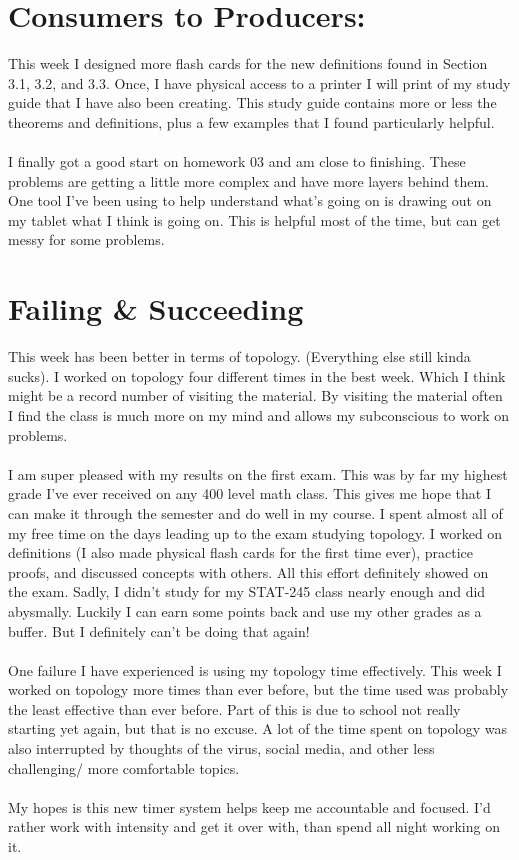 \documentclass[10pt]{article}
\begin{document}
\section*{Consumers to Producers:}
This week I designed more flash cards for the new definitions found in Section 3.1, 3.2, and 3.3. Once, I have physical access to a printer I will print of my study guide that I have also been creating. This study guide contains more or less the theorems and definitions, plus a few examples that I found particularly helpful.\\
\\
I finally got a good start on homework 03 and am close to finishing. These problems are getting a little more complex and have more layers behind them. One tool I've been using to help understand what's going on is drawing out on my tablet what I think is going on. This is helpful most of the time, but can get messy for some problems.

\section*{Failing \& Succeeding}
This week has been better in terms of topology. (Everything else still kinda sucks). I worked on topology four different times in the best week. Which I think might be a record number of visiting the material. By visiting the material often I find the class is much more on my mind and allows my subconscious to work on problems.\\
\\
I am super pleased with my results on the first exam. This was by far my highest grade I've ever received on any 400 level math class. This gives me hope that I can make it through the semester and do well in my course. I spent almost all of my free time on the days leading up to the exam studying topology. I worked on definitions (I also made physical flash cards for the first time ever), practice proofs, and discussed concepts with others. All this effort definitely showed on the exam. Sadly, I didn't study for my STAT-245 class nearly enough and did abysmally. Luckily I can earn some points back and use my other grades as a buffer. But I definitely can't be doing that again!\\
\\
One failure I have experienced is using my topology time effectively. This week I worked on topology more times than ever before, but the time used was probably the least effective than ever before. Part of this is due to school not really starting yet again, but that is no excuse. A lot of the time spent on topology was also interrupted by thoughts of the virus, social media, and other less challenging/ more comfortable topics.\\
\\
My hopes is this new timer system helps keep me accountable and focused. I'd rather work with intensity and get it over with, than spend all night working on it. 
\end{document}
